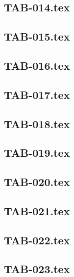 \renewcommand{\xxexo}{TAB-014.tex} 
\subsection*{\xxexo} 
\graphicspath{{../../exos/tableaux/TAB-014/}}
 
 
\renewcommand{\xxexo}{TAB-015.tex} 
\subsection*{\xxexo} 
\graphicspath{{../../exos/tableaux/TAB-015/}}
 
 
\renewcommand{\xxexo}{TAB-016.tex} 
\subsection*{\xxexo} 
\graphicspath{{../../exos/tableaux/TAB-016/}}
 
 
\renewcommand{\xxexo}{TAB-017.tex} 
\subsection*{\xxexo} 
\graphicspath{{../../exos/tableaux/TAB-017/}}
 
 
\renewcommand{\xxexo}{TAB-018.tex} 
\subsection*{\xxexo} 
\graphicspath{{../../exos/tableaux/TAB-018/}}
 
 
\renewcommand{\xxexo}{TAB-019.tex} 
\subsection*{\xxexo} 
\graphicspath{{../../exos/tableaux/TAB-019/}}
 
 
\renewcommand{\xxexo}{TAB-020.tex} 
\subsection*{\xxexo} 
\graphicspath{{../../exos/tableaux/TAB-020/}}
 
 
\renewcommand{\xxexo}{TAB-021.tex} 
\subsection*{\xxexo} 
\graphicspath{{../../exos/tableaux/TAB-021/}}
 
 
\renewcommand{\xxexo}{TAB-022.tex} 
\subsection*{\xxexo} 
\graphicspath{{../../exos/tableaux/TAB-022/}}
 
 
\renewcommand{\xxexo}{TAB-023.tex} 
\subsection*{\xxexo} 
\graphicspath{{../../exos/tableaux/TAB-023/}}
 
 
